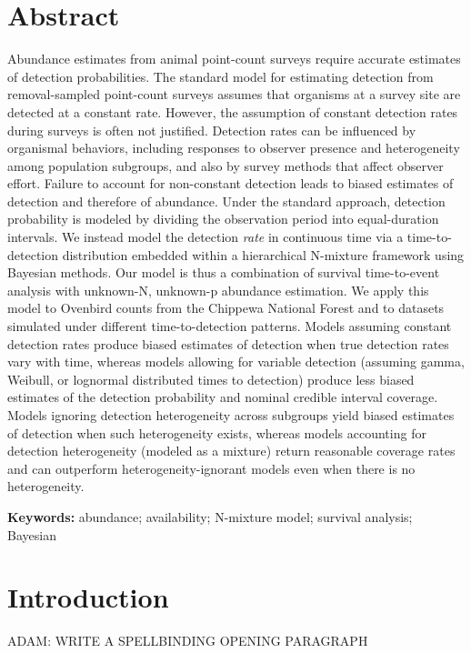 \documentclass[useAMS,usenatbib,referee,12pt]{article}
\newcommand{\adam}[1]{{\color{blue} ADAM: #1}}
\begin{document}

\section{Abstract}

Abundance estimates from animal point-count surveys require accurate estimates of detection probabilities.  The standard model for estimating detection from removal-sampled point-count surveys assumes that organisms at a survey site are detected at a constant rate.  However, the assumption of constant detection rates during surveys is often not justified.  Detection rates can be influenced by organismal behaviors, including responses to observer presence and heterogeneity among population subgroups, and also by survey methods that affect observer effort.  Failure to account for non-constant detection leads to biased estimates of detection and therefore of abundance.  Under the standard approach, detection probability is modeled by dividing the observation period into equal-duration intervals.  We instead model the detection {\it rate} in continuous time via a time-to-detection distribution embedded within a hierarchical N-mixture framework using Bayesian methods.  Our model is thus a combination of survival time-to-event analysis with unknown-N, unknown-p abundance estimation.  We apply this model to Ovenbird counts from the Chippewa National Forest and to datasets simulated under different time-to-detection patterns.  Models assuming constant detection rates produce biased estimates of detection when true detection rates vary with time, whereas models allowing for variable detection (assuming gamma, Weibull, or lognormal distributed times to detection) produce less biased estimates of the detection probability and nominal credible interval coverage.  Models ignoring detection heterogeneity across subgroups yield biased estimates of detection when such heterogeneity exists, whereas models accounting for detection heterogeneity (modeled as a mixture) return reasonable coverage rates and can outperform heterogeneity-ignorant models even when there is no heterogeneity.

{\bf Keywords:} abundance; availability; N-mixture model; survival analysis; Bayesian

\section{Introduction}\label{sec:intro}

\adam{WRITE A SPELLBINDING OPENING PARAGRAPH}
\end{document}
